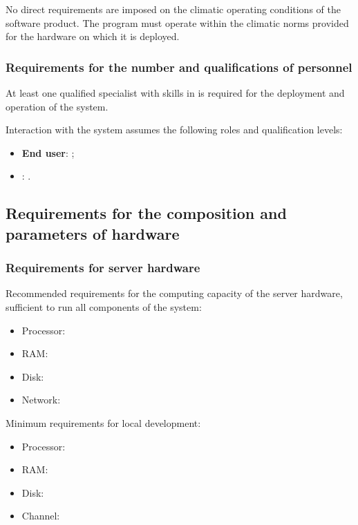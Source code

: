 \documentclass[12pt,a4paper]{extarticle}
\begin{document}
No direct requirements are imposed on the climatic operating conditions of the software product. The program must operate within the climatic norms provided for the hardware on which it is deployed.

\subsubsection{Requirements for the number and qualifications of personnel}

At least one qualified specialist with skills in  is required for the deployment and operation of the system.

Interaction with the system assumes the following roles and qualification levels:
\begin{itemize}[nosep, leftmargin=1.25cm]
    \item \textbf{End user}: ;
    \item \textbf{}: .
\end{itemize}

\subsection{Requirements for the composition and parameters of hardware}

\subsubsection{Requirements for server hardware}
\label{sec:server_hardware}

Recommended requirements for the computing capacity of the server hardware, sufficient to run all components of the system:

\begin{itemize}[leftmargin=1.25cm]
\item Processor: 
\item RAM: 
\item Disk: 
\item Network: 
\end{itemize}

Minimum requirements for local development:

\begin{itemize}[leftmargin=1.25cm]
\item Processor: 
\item RAM: 
\item Disk: 
\item Channel: 
\end{itemize}
\end{document}
